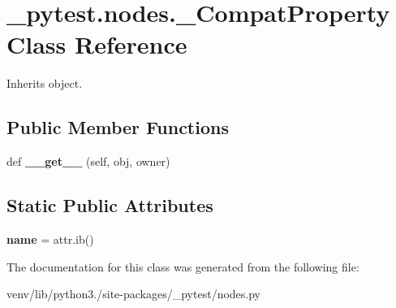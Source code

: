 \hypertarget{class__pytest_1_1nodes_1_1___compat_property}{}\section{\+\_\+pytest.\+nodes.\+\_\+\+Compat\+Property Class Reference}
\label{class__pytest_1_1nodes_1_1___compat_property}


Inherits object.

\subsection*{Public Member Functions}
\begin{DoxyCompactItemize}
\item 
\mbox{\label{class__pytest_1_1nodes_1_1___compat_property_ae9c23be557fd633ad27d7c09046e795e}} 
def {\bfseries \+\_\+\+\_\+get\+\_\+\+\_\+} (self, obj, owner)
\end{DoxyCompactItemize}
\subsection*{Static Public Attributes}
\begin{DoxyCompactItemize}
\item 
\mbox{\label{class__pytest_1_1nodes_1_1___compat_property_aa6dea9629977a153ad0cfbed505dd7c1}} 
{\bfseries name} = attr.\+ib()
\end{DoxyCompactItemize}


The documentation for this class was generated from the following file\+:\begin{DoxyCompactItemize}
\item 
venv/lib/python3./site-\/packages/\+\_\+pytest/nodes.\+py\end{DoxyCompactItemize}
